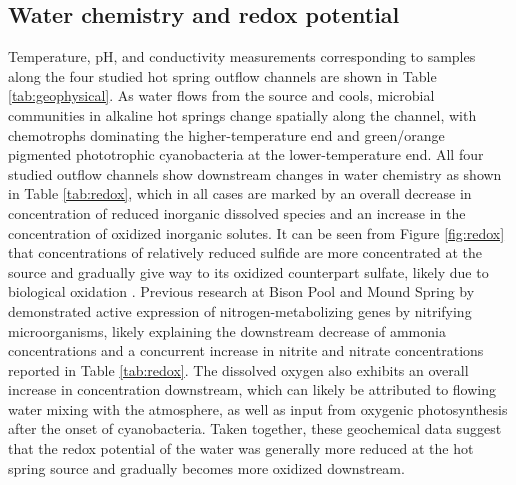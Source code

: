 \subsection{Water chemistry and redox potential} Temperature, pH, and conductivity measurements corresponding to samples along the four studied hot spring outflow channels are shown in Table \ref{tab:geophysical}. As water flows from the source and cools, microbial communities in alkaline hot springs change spatially along the channel, with chemotrophs dominating the higher-temperature end and green/orange pigmented phototrophic cyanobacteria at the lower-temperature end. All four studied outflow channels show downstream changes in water chemistry as shown in Table \ref{tab:redox}, which in all cases are marked by an overall decrease in concentration of reduced inorganic dissolved species and an increase in the concentration of oxidized inorganic solutes. It can be seen from Figure \ref{fig:redox} that concentrations of relatively reduced sulfide are more concentrated at the source and gradually give way to its oxidized counterpart sulfate, likely due to biological oxidation \citep{cox2011transition}. Previous research at Bison Pool and Mound Spring by \cite{loiacono2012evidence} demonstrated active expression of nitrogen-metabolizing genes by nitrifying microorganisms, likely explaining the downstream decrease of ammonia concentrations and a concurrent increase in nitrite and nitrate concentrations reported in Table \ref{tab:redox}. The dissolved oxygen also exhibits an overall increase in concentration downstream, which can likely be attributed to flowing water mixing with the atmosphere, as well as input from oxygenic photosynthesis after the onset of cyanobacteria. Taken together, these geochemical data suggest that the redox potential of the water was generally more reduced at the hot spring source and gradually becomes more oxidized downstream.


